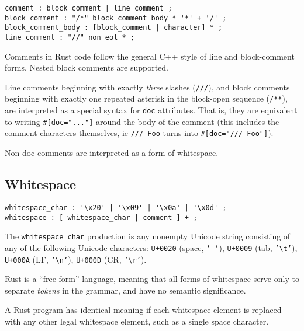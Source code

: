\documentclass[]{article}
\begin{document}
\begin{verbatim}
comment : block_comment | line_comment ;
block_comment : "/*" block_comment_body * '*' + '/' ;
block_comment_body : [block_comment | character] * ;
line_comment : "//" non_eol * ;
\end{verbatim}

Comments in Rust code follow the general C++ style of line and
block-comment forms. Nested block comments are supported.

Line comments beginning with exactly \emph{three} slashes
(\texttt{///}), and block comments beginning with exactly one repeated
asterisk in the block-open sequence (\texttt{/**}), are interpreted as a
special syntax for \texttt{doc} \hyperref[attributes]{attributes}. That
is, they are equivalent to writing \texttt{\#{[}doc="..."{]}} around the
body of the comment (this includes the comment characters themselves, ie
\texttt{/// Foo} turns into \texttt{\#{[}doc="/// Foo"{]}}).

Non-doc comments are interpreted as a form of whitespace.

\subsection{Whitespace}\label{whitespace}

\begin{verbatim}
whitespace_char : '\x20' | '\x09' | '\x0a' | '\x0d' ;
whitespace : [ whitespace_char | comment ] + ;
\end{verbatim}

The \texttt{whitespace\_char} production is any nonempty Unicode string
consisting of any of the following Unicode characters: \texttt{U+0020}
(space, \texttt{' '}), \texttt{U+0009} (tab,
\texttt{'\textbackslash{}t'}), \texttt{U+000A} (LF,
\texttt{'\textbackslash{}n'}), \texttt{U+000D} (CR,
\texttt{'\textbackslash{}r'}).

Rust is a ``free-form'' language, meaning that all forms of whitespace
serve only to separate \emph{tokens} in the grammar, and have no
semantic significance.

A Rust program has identical meaning if each whitespace element is
replaced with any other legal whitespace element, such as a single space
character.

\end{document}
